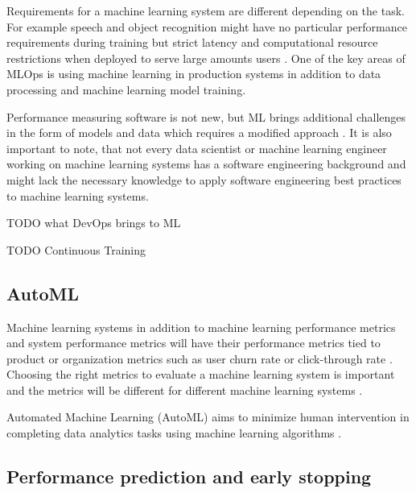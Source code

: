 Requirements for a machine learning system are different depending on the task. For example speech and object recognition might have no particular performance requirements during training but strict latency and computational resource restrictions when deployed to serve large amounts users \parencite{hintonDistillingKnowledgeNeural2015}. One of the key areas of MLOps is using machine learning in production systems in addition to data processing and machine learning model training.

Performance measuring software is not new, but ML brings additional challenges in the form of models and data which requires a modified approach \parencite{breckMLTestScore2017a}. It is also important to note, that not every data scientist or machine learning engineer working on machine learning systems has a software engineering background \parencite{finzerDataScienceEducation2013} and might lack the necessary knowledge to apply software engineering best practices to machine learning systems.

TODO what DevOps brings to ML

TODO Continuous Training

\subsection{AutoML}

Machine learning systems in addition to machine learning performance metrics and system performance metrics will have their performance metrics tied to product or organization metrics such as user churn rate or click-through rate \parencite{shankarOperationalizingMachineLearning2022}. Choosing the right metrics to evaluate a machine learning system is important and the metrics will be different for different machine learning systems \parencite{shankarOperationalizingMachineLearning2022}.

Automated Machine Learning (AutoML) aims to minimize human intervention in completing data analytics tasks using machine learning algorithms \parencite{yangIoTDataAnalytics2022}.

\subsection{Performance prediction and early stopping}

